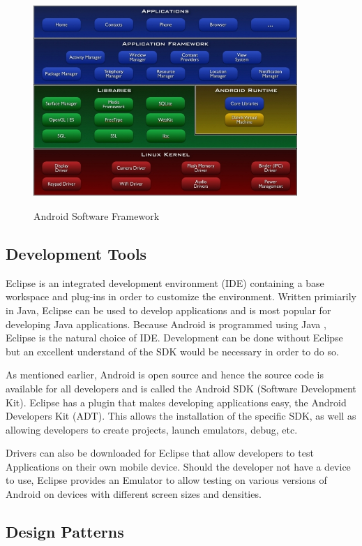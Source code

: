 \documentclass{l4proj}
\begin{document}
\begin{appendices}
\begin{figure}
\centering
\includegraphics[height=8cm,width=10cm]{android_architecture.jpg}
\vspace{0mm}
\caption{Android Software Framework}
\label{SoftwareFramework}
\end{figure}

\subsection{Development Tools}
Eclipse is an integrated development environment (IDE) containing a base workspace and plug-ins in order to customize the environment. Written primiarily in Java, Eclipse can be used to develop applications and is most popular for developing Java applications. Because Android is programmed using Java , Eclipse is the natural choice of IDE. Development can be done without Eclipse but an excellent understand of the SDK would be necessary in order to do so.  

As mentioned earlier, Android is open source and hence the source code is available for all developers and is called the Android SDK (Software Development Kit). Eclipse has a plugin that makes developing applications easy, the Android Developers Kit (ADT). This allows the installation of the specific SDK, as well as allowing developers to create projects, launch emulators, debug, etc.

Drivers can also be downloaded for Eclipse that allow developers to test Applications on their own mobile device.  Should the developer not have a device to use, Eclipse provides an Emulator to allow testing on various versions of Android on devices with different screen sizes and densities. 

\subsection{Design Patterns}


\end{appendices}
\end{document}
